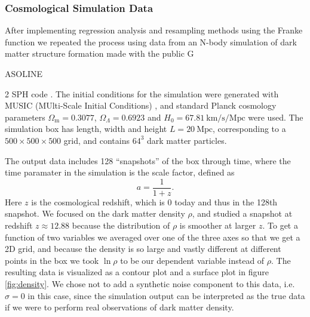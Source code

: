 \documentclass[aps,pra,english,notitlepage,reprint,nofootinbib]{revtex4-1}  %
\begin{document}
\subsubsection{Cosmological Simulation Data}
After implementing regression analysis and resampling methods using the Franke function we repeated the process using data from an N-body simulation of dark matter structure formation made with the public G\begin{footnotesize}ASOLINE\end{footnotesize}2 SPH code \cite{gasoline}. The initial conditions for the simulation were generated with MUSIC (MUlti-Scale Initial Conditions) \cite{music}, and standard Planck cosmology parameters $\Omega_\text{m}=0.3077$, $\Omega_{\Lambda}=0.6923$ and $H_0=67.81\:\text{km/s/Mpc}$ were used. The simulation box has length, width and height $L=20\:\text{Mpc}$, corresponding to a $500\times500\times500$ grid, and contains $64^3$ dark matter particles. 

The output data includes 128 ``snapshots'' of the box through time, where the time paramater in the simulation is the scale factor, defined as
\begin{equation*}
  a = \frac{1}{1+z}.
\end{equation*}
Here $z$ is the cosmological redshift, which is 0 today and thus in the 128th snapshot. We focused on the dark matter density $\rho$, and studied a snapshot at redshift $z\approx12.88$ because the distribution of $\rho$ is smoother at larger $z$. To get a function of two variables we averaged over one of the three axes so that we get a 2D grid, and because the density is so large and vastly different at different points in the box we took $\ln\rho$ to be our dependent variable instead of $\rho$. The resulting data is visualized as a contour plot and a surface plot in figure \ref{fig:density}. We chose not to add a synthetic noise component to this data, i.e. $\sigma=0$ in this case, since the simulation output can be interpreted as the true data if we were to perform real observations of dark matter density.
\end{document}
